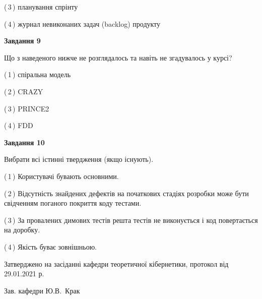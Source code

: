 \documentclass[10pt, ukrainian]{article}
\begin{document}
{\begin {large}
(\,3\,) планування спрінту%



(\,4\,) журнал невиконаних задач (backlog) продукту%


{\begin {center}\textbf{Завдання 9}\end {center}}\par
Що з наведеного нижче не розглядалось та навіть не згадувалось у курсі?\par
\vspace{2mm}



(\,1\,) спіральна модель%



(\,2\,) CRAZY%



(\,3\,) PRINCE2%



(\,4\,) FDD%


{\begin {center}\textbf{Завдання 10}\end {center}}\par
Вибрати всі істинні твердження (якщо існують).\par
\vspace{2mm}



(\,1\,) Користувачі бувають основними.%



(\,2\,) Відсутність знайдених дефектів на початкових стадіях розробки може бути свідченням поганого покриття коду тестами.%



(\,3\,) За провалених димових тестів решта тестів не виконується і код повертається на доробку.%



(\,4\,) Якість буває зовнішньою.%



\end {large}}
{\vspace{5mm}\smallskip \begin {small} Затверджено на засіданні кафедри теоретичної кібернетики, протокол  від   29.01.2021 р.\par\smallskip\smallskip
{\parbox {6.5 cm}{Зав. кафедри \dotfill Ю.В.~Крак}} \end{small}}
\newpage
\end{document}
